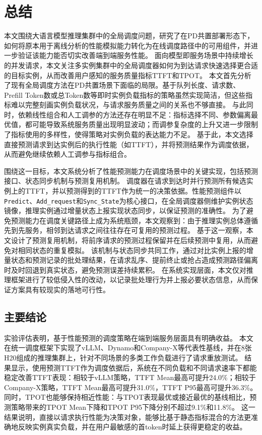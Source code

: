 
\chapter{总结}

本文围绕大语言模型推理集群中的全局调度问题，研究了在PD共置部署形态下，如何将原本用于离线分析的性能模拟能力转化为在线调度路径中的可用组件，并进一步验证该能力能否切实改善端到端服务性能。
面向模型即服务场景中持续增长的并发请求，本文关注多实例集群中的全局调度器如何为到达请求快速选择更合适的目标实例，从而改善用户感知的服务质量指标TTFT和TPOT。
本文首先分析了现有全局调度方法在PD共置场景下面临的局限。基于队列长度、请求数、Prefill Token数或总Token数等即时实例负载指标的策略虽然实现简洁，但这些指标难以完整刻画实例负载状况，与请求服务质量之间的关系也不够直接。
与此同时，依赖线性组合和人工调参的方法还存在明显不足：指标选择不同、参数偏离最优值，都可能导致系统服务质量出现明显波动；而调参复杂度的上升又进一步限制了指标使用的多样性，使得策略对实例负载的表达能力不足。
基于此，本文选择直接预测请求到达实例后的执行性能（如TTFT），并将预测结果作为调度依据，从而避免继续依赖人工调参与指标组合。

围绕这一目标，本文系统分析了性能预测能力在调度场景中的关键实现，包括预测接口、状态同步机制与预测复用机制。
调度器在请求到达时并行预测所有候选实例上的TTFT，并以预测得到的TTFT作为统一的决策依据。性能预测组件以\texttt{Predict}、\texttt{Add\_request}和\texttt{Sync\_State}为核心接口，在全局调度器侧维护实例状态镜像，推理实例通过增量状态上报实现状态同步，以保证预测的准确性。
为了避免预测能力在调度关键路径上成为系统瓶颈，本文观察到：由于推理实例总体遵循先到先服务，相邻到达请求之间往往存在可复用的预测过程。
基于这一观察，本文设计了预测复用机制，将前序请求的预测过程保留并在后续预测中复用，从而避免对相同状态的重复模拟。
该机制与状态同步共同工作，通过对比实例上报的增量状态和预测记录的批处理结果，在请求乱序、提前终止或抢占造成预测路径偏离时及时回退到真实状态，避免预测误差持续累积。
在系统实现层面，本文仅对推理框架进行了较低侵入性的改动，以记录批处理行为并上报必要状态信息，从而保证方案具有较现实的落地可行性。

\section{主要结论}
实验评估表明，基于性能预测的调度策略在端到端服务层面具有明确收益。
本文在统一调度框架下实现了vLLM、Dynamo和Company-X等代表性基线，并在8张H20组成的推理集群上，针对不同场景的多类工作负载进行了请求重放测试。
结果显示，使用预测TTFT作为调度依据后，系统在不同负载和不同请求速率下都能稳定改善TTFT表现：相较于vLLM策略，TTFT Mean最高可提升24.0\%；相较于Company-X策略，TTFT Mean最高可提升31.0\%，TTFT P95最高可提升36.3\%。
同时，TPOT也能够保持相近性能：与TPOT表现最优或接近最优的基线相比，预测策略带来的TPOT Mean下降和TPOT P95下降分别不超过9.1\%和11.8\%。
这一结果说明，直接以请求执行性能为决策对象，能够比基于静态指标混合的方法更准确地反映实例真实负载，并在用户最敏感的首token时延上获得更稳定的收益。

